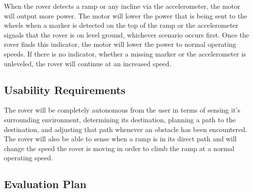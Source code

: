 When the rover detects a ramp or any incline via the accelerometer, the motor will output more power. The motor will lower the power that is being sent to the wheels when a marker is detected on the top of the ramp or the accelerometer signals that the rover is on level ground, whichever scenario occurs first. Once the rover finds this indicator, the motor will lower the power to normal operating speeds. If there is no indicator, whether a missing marker or the accelerometer is unleveled, the rover will continue at an increased speed.

\subsection*{Usability Requirements}
The rover will be completely autonomous from the user in terms of sensing it’s surrounding environment, determining its destination, planning a path to the destination, and adjusting that path whenever an obstacle has been encountered. The rover will also be able to sense when a ramp is in its direct path and will change the speed the rover is moving in order to climb the ramp at a normal operating speed. 

\subsection*{Evaluation Plan}







